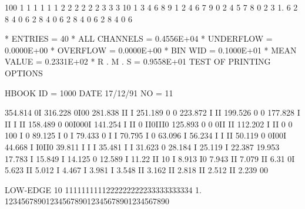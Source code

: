 \begin{Listing}
     100                               1   1   1   1   1   1   2   2   2   2   2   2   3   3   3
      10       1   3   4   6   8   9   1   2   4   6   7   9   0   2   4   5   7   8   0   2   3
       1.      6   2   8   4   0   6   2   8   4   0   6   2   8   4   0   6   2   8   4   0   6
 
 * ENTRIES =         40      * ALL CHANNELS = 0.4556E+04      * UNDERFLOW = 0.0000E+00      * OVERFLOW = 0.0000E+00
 * BIN WID = 0.1000E+01      * MEAN VALUE   = 0.2331E+02      * R . M . S = 0.9558E+01
\finalnewpage
 TEST OF PRINTING OPTIONS                                                        
 
 HBOOK     ID =      1000                                        DATE  17/12/91              NO =  11
 
      354.814                 0I
      316.228                0I00
      281.838               II  I
      251.189               0    0
      223.872              I     II
      199.526              0      0
      177.828              I      II            I  II
      158.489                      0            00I000I
      141.254             I        II         0 II0III0
      125.893             0         0        0II      II
      112.202             I                 II 0       0
      100                            I      0
       89.125            I           0      I
       79.433            0           I     I
       70.795            I                 0
       63.096                              I
       56.234           I             I II
       50.119           0             0I00I
       44.668           I             I0II0
       39.811           I              I  I
       35.481          I               I
       31.623          0
       28.184          I
       25.119          I
       22.387
       19.953
       17.783         I
       15.849         I
       14.125         0
       12.589         I
       11.22         II
       10            I
        8.913       I0
        7.943       II
        7.079       II
        6.31        0I
        5.623       II
        5.012       I
        4.467       I
        3.981       I
        3.548     II
        3.162     II
        2.818     II
        2.512     II
        2.239     00
 
 LOW-EDGE  10            1111111111222222222233333333334
            1.  1234567890123456789012345678901234567890
 

\end{Listing}
